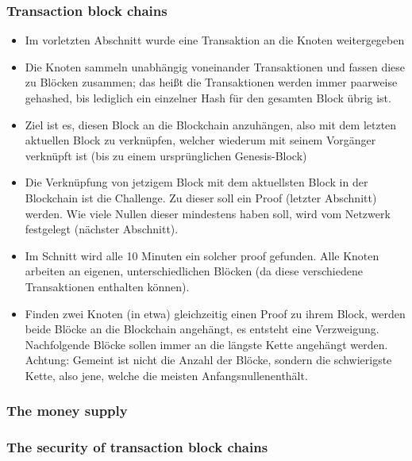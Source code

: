 \documentclass{article} %
\begin{document}
	\subsubsection{Transaction block chains}
	\begin{itemize}
		\item Im vorletzten Abschnitt wurde eine Transaktion an die Knoten weitergegeben
		\item Die Knoten sammeln unabhängig voneinander Transaktionen und fassen diese zu Blöcken zusammen; das heißt die Transaktionen werden immer paarweise gehashed, bis lediglich ein einzelner Hash für den gesamten Block übrig ist.
		\item Ziel ist es, diesen Block an die Blockchain anzuhängen, also mit dem letzten aktuellen Block zu verknüpfen, welcher wiederum mit seinem Vorgänger verknüpft ist (bis zu einem ursprünglichen Genesis-Block)
		\item Die Verknüpfung von jetzigem Block mit dem aktuellsten Block in der Blockchain ist die Challenge. 
		Zu dieser soll ein Proof (letzter Abschnitt) werden.
		Wie viele Nullen dieser mindestens haben soll, wird vom Netzwerk festgelegt (nächster Abschnitt).
		\item Im Schnitt wird alle 10 Minuten ein solcher proof gefunden.
		Alle Knoten arbeiten an eigenen, unterschiedlichen Blöcken (da diese verschiedene Transaktionen enthalten können).
		\item Finden zwei Knoten (in etwa) gleichzeitig einen Proof zu ihrem Block, werden beide Blöcke an die Blockchain angehängt, es entsteht eine Verzweigung.
		Nachfolgende Blöcke sollen immer an die längste Kette angehängt werden.
		Achtung: Gemeint ist nicht die Anzahl der Blöcke, sondern die schwierigste Kette, also jene, welche die meisten \glqq Anfangsnullen\grqq enthält.
	\end{itemize}
	\subsubsection{The money supply}
	\subsubsection{The security of transaction block chains}
	
	
	
\end{document}
